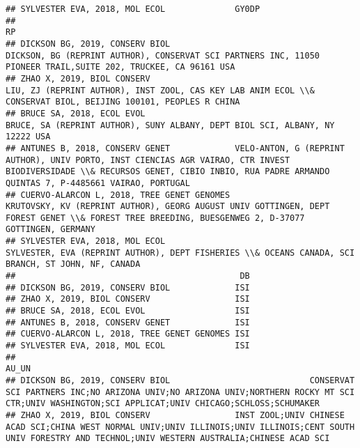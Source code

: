 \documentclass[]{article}
\begin{document}
\begin{verbatim}
## SYLVESTER EVA, 2018, MOL ECOL              GY0DP
##                                                                                                                                                                                                                                  RP
## DICKSON BG, 2019, CONSERV BIOL                                                                                       DICKSON, BG (REPRINT AUTHOR), CONSERVAT SCI PARTNERS INC, 11050 PIONEER TRAIL,SUITE 202, TRUCKEE, CA 96161 USA
## ZHAO X, 2019, BIOL CONSERV                                                                                           LIU, ZJ (REPRINT AUTHOR), INST ZOOL, CAS KEY LAB ANIM ECOL \\& CONSERVAT BIOL, BEIJING 100101, PEOPLES R CHINA
## BRUCE SA, 2018, ECOL EVOL                                                                                                                              BRUCE, SA (REPRINT AUTHOR), SUNY ALBANY, DEPT BIOL SCI, ALBANY, NY 12222 USA
## ANTUNES B, 2018, CONSERV GENET             VELO-ANTON, G (REPRINT AUTHOR), UNIV PORTO, INST CIENCIAS AGR VAIRAO, CTR INVEST BIODIVERSIDADE \\& RECURSOS GENET, CIBIO INBIO, RUA PADRE ARMANDO QUINTAS 7, P-4485661 VAIRAO, PORTUGAL
## CUERVO-ALARCON L, 2018, TREE GENET GENOMES                                        KRUTOVSKY, KV (REPRINT AUTHOR), GEORG AUGUST UNIV GOTTINGEN, DEPT FOREST GENET \\& FOREST TREE BREEDING, BUESGENWEG 2, D-37077 GOTTINGEN, GERMANY
## SYLVESTER EVA, 2018, MOL ECOL                                                                                                    SYLVESTER, EVA (REPRINT AUTHOR), DEPT FISHERIES \\& OCEANS CANADA, SCI BRANCH, ST JOHN, NF, CANADA
##                                             DB
## DICKSON BG, 2019, CONSERV BIOL             ISI
## ZHAO X, 2019, BIOL CONSERV                 ISI
## BRUCE SA, 2018, ECOL EVOL                  ISI
## ANTUNES B, 2018, CONSERV GENET             ISI
## CUERVO-ALARCON L, 2018, TREE GENET GENOMES ISI
## SYLVESTER EVA, 2018, MOL ECOL              ISI
##                                                                                                                                                                                                      AU_UN
## DICKSON BG, 2019, CONSERV BIOL                            CONSERVAT SCI PARTNERS INC;NO ARIZONA UNIV;NO ARIZONA UNIV;NORTHERN ROCKY MT SCI CTR;UNIV WASHINGTON;SCI APPLICAT;UNIV CHICAGO;SCHLOSS;SCHUMAKER
## ZHAO X, 2019, BIOL CONSERV                 INST ZOOL;UNIV CHINESE ACAD SCI;CHINA WEST NORMAL UNIV;UNIV ILLINOIS;UNIV ILLINOIS;CENT SOUTH UNIV FORESTRY AND TECHNOL;UNIV WESTERN AUSTRALIA;CHINESE ACAD SCI

\end{verbatim}
\end{document}
